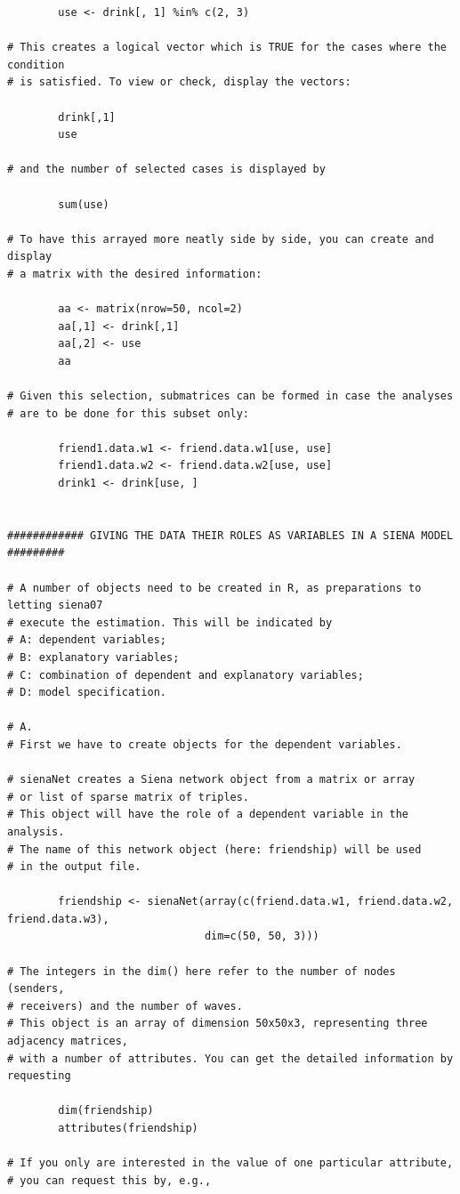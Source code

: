 \documentclass[a4paper,fleqn]{article}
\newcommand{\+}{\, + \,}
\begin{document}
{\begin{verbatim}
        use <- drink[, 1] %in% c(2, 3)

# This creates a logical vector which is TRUE for the cases where the condition
# is satisfied. To view or check, display the vectors:

        drink[,1]
        use

# and the number of selected cases is displayed by

        sum(use)

# To have this arrayed more neatly side by side, you can create and display
# a matrix with the desired information:

        aa <- matrix(nrow=50, ncol=2)
        aa[,1] <- drink[,1]
        aa[,2] <- use
        aa

# Given this selection, submatrices can be formed in case the analyses
# are to be done for this subset only:

        friend1.data.w1 <- friend.data.w1[use, use]
        friend1.data.w2 <- friend.data.w2[use, use]
        drink1 <- drink[use, ]


############ GIVING THE DATA THEIR ROLES AS VARIABLES IN A SIENA MODEL #########

# A number of objects need to be created in R, as preparations to letting siena07
# execute the estimation. This will be indicated by
# A: dependent variables;
# B: explanatory variables;
# C: combination of dependent and explanatory variables;
# D: model specification.

# A.
# First we have to create objects for the dependent variables.

# sienaNet creates a Siena network object from a matrix or array
# or list of sparse matrix of triples.
# This object will have the role of a dependent variable in the analysis.
# The name of this network object (here: friendship) will be used
# in the output file.

        friendship <- sienaNet(array(c(friend.data.w1, friend.data.w2, friend.data.w3),
                               dim=c(50, 50, 3)))

# The integers in the dim() here refer to the number of nodes (senders,
# receivers) and the number of waves.
# This object is an array of dimension 50x50x3, representing three adjacency matrices,
# with a number of attributes. You can get the detailed information by requesting

        dim(friendship)
        attributes(friendship)

# If you only are interested in the value of one particular attribute,
# you can request this by, e.g.,


\end{verbatim}}
\end{document}
